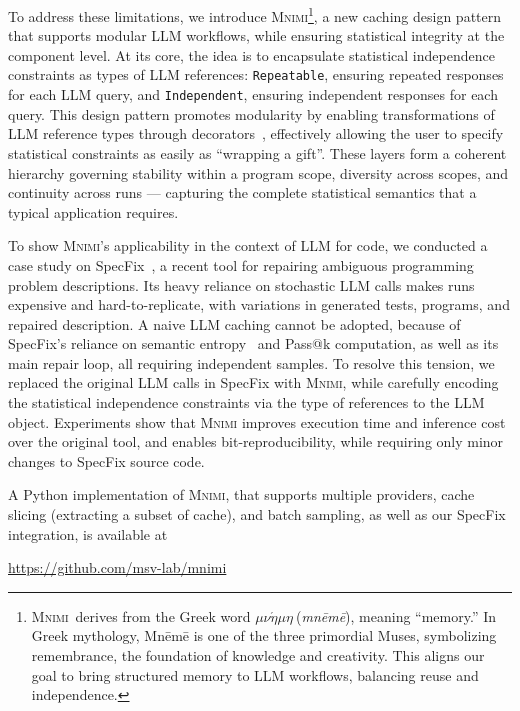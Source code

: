 \documentclass[sigconf]{acmart}
\newcommand{\mnem}{$\mu\nu\acute{\eta}\mu\eta\ $}
\newcommand{\projName}{\textsc{Mnimi}\xspace}
\begin{document}
To address these limitations, we introduce \projName \footnote{\projName\ derives from the Greek word \mnem (\textit{mnēmē}), meaning ``memory.'' In Greek mythology, Mnēmē is one of the three primordial Muses, symbolizing remembrance, the foundation of knowledge and creativity. This aligns our goal to bring structured memory to LLM workflows, balancing reuse and independence.}, a new caching design pattern that supports modular LLM workflows, while ensuring statistical integrity at the component level. At its core, the idea is to encapsulate statistical independence constraints as types of LLM references: \texttt{Repeatable}, ensuring repeated responses for each LLM query, and \texttt{Independent}, ensuring independent responses for each query. This design pattern promotes modularity by enabling transformations of LLM reference types through decorators~\cite{gamma1995design}, effectively allowing the user to specify statistical constraints as easily as ``wrapping a gift''. These layers form a coherent hierarchy governing stability within a program scope, diversity across scopes, and continuity across runs --- capturing the complete statistical semantics that a typical application requires.

To show \projName's applicability in the context of LLM for code, we conducted a case study on SpecFix~\cite{jia2025automatedrepairambiguousproblem}, a recent tool for repairing ambiguous programming problem descriptions. Its heavy reliance on stochastic LLM calls makes runs expensive and hard-to-replicate, with variations in generated tests, programs, and repaired description. A naive LLM caching cannot be adopted, because of SpecFix's reliance on semantic entropy~\cite{kuhn2023semantic} and Pass@k computation, as well as its main repair loop, all requiring independent samples. To resolve this tension, we replaced the original LLM calls in SpecFix with \projName, while carefully encoding the statistical independence constraints via the type of references to the LLM object. Experiments show that \projName improves execution time and inference cost over the original tool, and enables bit-reproducibility, while requiring only minor changes to SpecFix source code.

A Python implementation of \projName, that supports multiple providers, cache slicing (extracting a subset of cache), and batch sampling, as well as our SpecFix integration, is available at
\begin{center}
  \url{https://github.com/msv-lab/mnimi}
\end{center}
\end{document}

